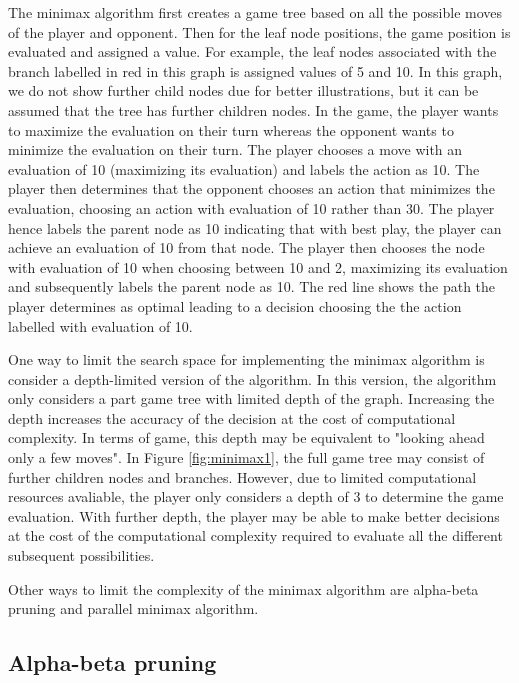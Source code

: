 The minimax algorithm first creates a game tree based on all the possible moves of the player and opponent. Then for the leaf node positions, the game position is evaluated and assigned a value. For example, the leaf nodes associated with the branch labelled in red in this graph is assigned values of 5 and 10. In this graph, we do not show further child nodes due for better illustrations, but it can be assumed that the tree has further children nodes. In the game, the player wants to maximize the evaluation on their turn whereas the opponent wants to minimize the evaluation on their turn. The player chooses a move with an evaluation of 10 (maximizing its evaluation) and labels the action as 10. The player then determines that the opponent chooses an action that minimizes the evaluation, choosing an action with evaluation of 10 rather than 30. The player hence labels the parent node as 10 indicating that with best play, the player can achieve an evaluation of 10 from that node. The player then chooses the node with evaluation of 10 when choosing between 10 and 2, maximizing its evaluation and subsequently labels the parent node as 10. The red line shows the path the player determines as optimal leading to a decision choosing the the action labelled with evaluation of 10. 

One way to limit the search space for implementing the minimax algorithm is consider a depth-limited version of the algorithm. In this version, the algorithm only considers a part game tree with limited depth of the graph. Increasing the depth increases the accuracy of the decision at the cost of computational complexity. In terms of game, this depth may be equivalent to "looking ahead only a few moves".  In Figure \ref{fig:minimax1}, the full game tree may consist of further children nodes and branches. However, due to limited computational resources avaliable, the player only considers a depth of 3 to determine the game evaluation. With further depth, the player may be able to make better decisions at the cost of the computational complexity required to evaluate all the different subsequent possibilities.

Other ways to limit the complexity of the minimax algorithm are alpha-beta pruning and parallel minimax algorithm.
 
\subsection{Alpha-beta pruning}

